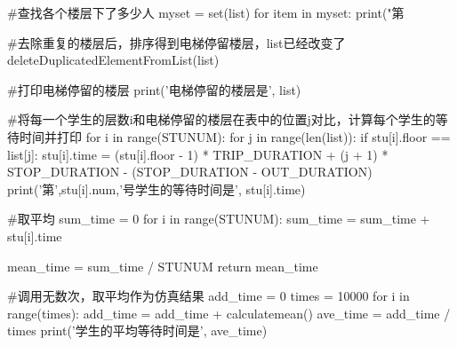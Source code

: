 \documentclass[letterpaper,12pt]{article}
\begin{document}
\begin{appendix}
\begin{python}
    #查找各个楼层下了多少人
    myset = set(list)
    for item in myset:
        print("第%

    #去除重复的楼层后，排序得到电梯停留楼层，list已经改变了
    deleteDuplicatedElementFromList(list)

    #打印电梯停留的楼层
    print('电梯停留的楼层是', list)

    #将每一个学生的层数i和电梯停留的楼层在表中的位置j对比，计算每个学生的等待时间并打印
    for i in range(STUNUM):
        for j in range(len(list)):
            if stu[i].floor == list[j]:
                stu[i].time = (stu[i].floor - 1) * TRIP_DURATION + (j + 1) * STOP_DURATION - (STOP_DURATION - OUT_DURATION)
        print('第',stu[i].num,'号学生的等待时间是', stu[i].time)

    #取平均
    sum_time = 0
    for i in range(STUNUM):
        sum_time = sum_time + stu[i].time

    mean_time = sum_time / STUNUM
    return mean_time

#调用无数次，取平均作为仿真结果
add_time = 0
times = 10000
for i in range(times):
    add_time = add_time + calculatemean()
ave_time = add_time / times
print('学生的平均等待时间是', ave_time)
\end{python}
\end{appendix}
\end{document}
